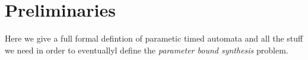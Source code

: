\section{Preliminaries}

Here we give a full formal defintion of parametic timed automata and all the stuff we need in order to eventuallyl define the \textit{parameter bound synthesis} problem.
